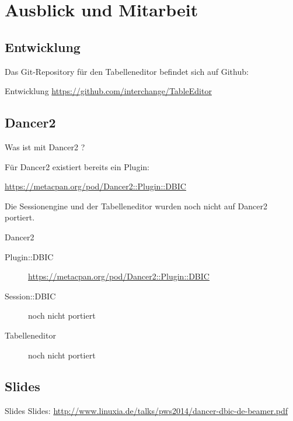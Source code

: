 \section{Ausblick und Mitarbeit}

\subsection{Entwicklung}

Das Git-Repository für den Tabelleneditor befindet sich auf Github:

\begin{frame}{Entwicklung}
\url{https://github.com/interchange/TableEditor}
\end{frame}

\subsection{Dancer2}

Was ist mit Dancer2 ?

Für Dancer2 existiert bereits ein Plugin:

\url{https://metacpan.org/pod/Dancer2::Plugin::DBIC}

Die Sessionengine und der Tabelleneditor wurden noch nicht auf Dancer2 portiert.

\begin{frame}{Dancer2}
  \begin{description}
  \item[Plugin::DBIC] \url{https://metacpan.org/pod/Dancer2::Plugin::DBIC}
  \item[Session::DBIC] noch nicht portiert
  \item[Tabelleneditor] noch nicht portiert
  \end{description}
\end{frame}


\subsection{Slides}

\begin{frame}{Slides}
Slides:
\url{http://www.linuxia.de/talks/pws2014/dancer-dbic-de-beamer.pdf}
\end{frame}



